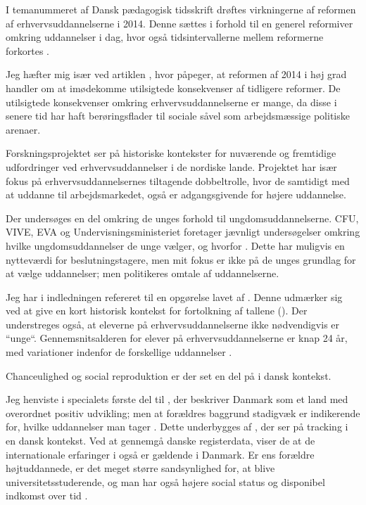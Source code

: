 I temanummeret  af Dansk pædagogisk tidsskrift drøftes virkningerne af reformen af erhvervsuddannelserne i 2014.
Denne sættes i forhold til en generel reformiver omkring uddannelser i dag, hvor også tidsintervallerne mellem reformerne forkortes \autocite[s. 2]{cangerTemaErhvervsuddannelserMellem2016}. 

Jeg hæfter mig især ved artiklen , hvor \citeauthor{jorgensenReformenAfErhvervsuddannelserne2016} påpeger, at reformen af 2014 i høj grad handler om at imødekomme utilsigtede konsekvenser af tidligere reformer.
De utilsigtede konsekvenser omkring erhvervsuddannelserne er mange, da disse i senere tid har haft berøringsflader til sociale såvel som arbejdsmæssige politiske arenaer.

Forskningsprojektet  ser på historiske kontekster for nuværende og fremtidige udfordringer ved erhvervsuddannelser i de nordiske lande.
Projektet har især fokus på erhvervsuddannelsernes tiltagende dobbeltrolle, hvor de samtidigt med at uddanne til arbejdsmarkedet, også er adgangsgivende for højere uddannelse.

Der undersøges en del omkring de unges forhold til ungdomsuddannelserne.
CFU, VIVE, EVA og Undervisningsministeriet foretager jævnligt undersøgelser omkring hvilke ungdomsuddannelser de unge vælger, og hvorfor \autocite[se fx.][]{undervisningsministerietOg10Klasseelevernes2017, borne-ogundervisningsministerietHvemOgHvor, danmarksstatistikErhvervsuddannelserDanmark20192019}.
Dette har muligvis en nytteværdi for beslutningstagere, men mit fokus er ikke på de unges grundlag for at vælge uddannelser; men politikeres omtale af uddannelserne.

Jeg har i indledningen refereret til en opgørelse lavet af \citeauthor{danmarksstatistikErhvervsuddannelserDanmark20192019}.
Denne udmærker sig ved at give en kort historisk kontekst for fortolkning af tallene (\citeyear[s. 8ff]{danmarksstatistikErhvervsuddannelserDanmark20192019}).
Der understreges også, at eleverne på erhvervsuddannelserne ikke nødvendigvis er “unge“.
Gennemsnitsalderen for elever på erhvervsuddannelserne er knap 24 år, med variationer indenfor de forskellige uddannelser \autocite[s. 14]{danmarksstatistikErhvervsuddannelserDanmark20192019}.

Chanceulighed og social reproduktion er der set en del på i dansk kontekst.

Jeg henviste i specialets første del til \citeauthor{munkSocialUlighedOg2014}, der beskriver Danmark som et land med overordnet positiv udvikling; men at forældres baggrund stadigvæk er indikerende for, hvilke uddannelser man tager \autocite{munkSocialUlighedOg2014}.
Dette underbygges af \citeauthor{felsbirkelundStructureCausesConsequencesInprogress}, der ser på tracking i en dansk kontekst.
Ved at gennemgå danske registerdata, viser de at de internationale erfaringer i også er gældende i Danmark.
Er ens forældre højtuddannede, er det meget større sandsynlighed for, at blive universitetsstuderende, og man har også højere social status og disponibel indkomst over tid \autocite{felsbirkelundStructureCausesConsequencesInprogress}.

